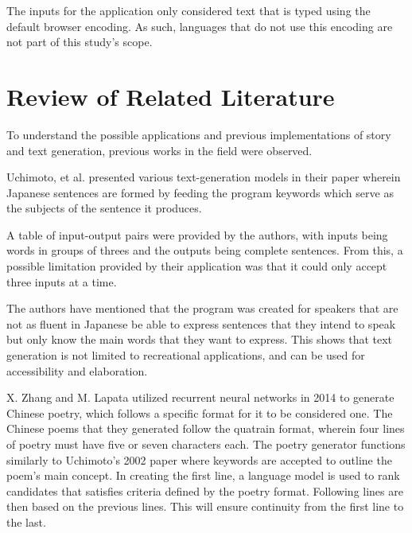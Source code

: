 \documentclass[journal]{./IEEE/IEEEtran}
\begin{document}
The inputs for the application only considered text that is typed using the default browser encoding. As such, languages that do not use this encoding are not part of this study's scope.

\section{Review of Related Literature}

To understand the possible applications and previous implementations of story and text generation, previous works in the field were observed.
\pubidadjcol

Uchimoto, et al. presented various text-generation models in their paper wherein Japanese sentences are formed by feeding the program keywords which serve as the subjects of the sentence it produces. \cite{UKIHSS2002} 

A table of input-output pairs were provided by the authors, with inputs being words in groups of threes and the outputs being complete sentences. From this, a possible limitation provided by their application was that it could only accept three inputs at a time.

The authors have mentioned that the program was created for speakers that are not as fluent in Japanese be able to express sentences that they intend to speak but only know the main words that they want to express. This shows that text generation is not limited to recreational applications, and can be used for accessibility and elaboration. %

X. Zhang and M. Lapata utilized recurrent neural networks in 2014 to generate Chinese poetry, which follows a specific format for it to be considered one.
\cite{ZXLM2014}
The Chinese poems that they generated follow the quatrain format, wherein four lines of poetry must have five or seven characters each.
The poetry generator functions similarly to Uchimoto's 2002 paper where keywords are accepted to outline the poem's main concept.
In creating the first line, a language model is used to rank candidates that satisfies criteria defined by the poetry format. Following lines are then based on the previous lines. This will ensure continuity from the first line to the last.
\end{document}
